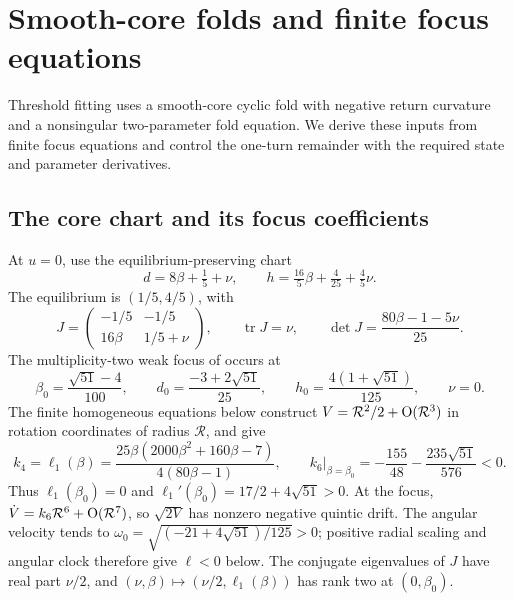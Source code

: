 \section{Smooth-core folds and finite focus equations}
\label{app:harvesting-fold}

Threshold fitting uses a smooth-core cyclic fold with negative return
curvature and a nonsingular two-parameter fold equation. We derive these
inputs from finite focus equations and control the one-turn remainder
with the required state and parameter derivatives.

\subsection{The core chart and its focus coefficients}

At \(u=0\), use the equilibrium-preserving chart
\begin{equation}\label{eq:harvesting:core-chart}
 d=8\beta+\tfrac15+\nu,\qquad
 h=\tfrac{16}{5}\beta+\tfrac4{25}+\tfrac45\nu.
\end{equation}
The equilibrium is \((1/5,4/5)\), with
\[
 J=\begin{pmatrix}-1/5&-1/5\\16\beta&1/5+\nu\end{pmatrix},
 \qquad \operatorname{tr}J=\nu,\qquad
 \det J=\frac{80\beta-1-5\nu}{25}.
\]
The multiplicity-two weak focus of
\cite[Theorem~3.6]{huang2013} occurs at
\begin{equation}\label{eq:harvesting:bautin-point}
 \beta_0=\frac{\sqrt{51}-4}{100},\qquad
 d_0=\frac{-3+2\sqrt{51}}{25},\qquad
 h_0=\frac{4(1+\sqrt{51})}{125},\qquad \nu=0.
\end{equation}
The finite homogeneous equations below construct \(V=\mathcal R^2/2+\mathrm{O}(\mathcal R^3)\) in rotation
coordinates of radius \(\mathcal R\), and give
\begin{equation}\label{eq:harvesting:focus-data}
 k_4=\ell_1(\beta)
 =\frac{25\beta(2000\beta^2+160\beta-7)}{4(80\beta-1)},
 \qquad k_6\big|_{\beta=\beta_0}
 =-\frac{155}{48}-\frac{235\sqrt{51}}{576}<0.
\end{equation}
Thus \(\ell_1(\beta_0)=0\) and
\(\ell_1'(\beta_0)=17/2+4\sqrt{51}>0\). At the focus,
\(\dot V=k_6\mathcal R^6+\mathrm{O}(\mathcal R^7)\), so
\(\sqrt{2V}\) has nonzero negative quintic drift. The angular
velocity tends to
\(\omega_0=\sqrt{(-21+4\sqrt{51})/125}>0\); positive radial
scaling and angular clock therefore give \(\ell<0\) below.
The conjugate eigenvalues of \(J\) have real part \(\nu/2\), and
\((\nu,\beta)\mapsto(\nu/2,\ell_1(\beta))\) has rank two at
\((0,\beta_0)\).

